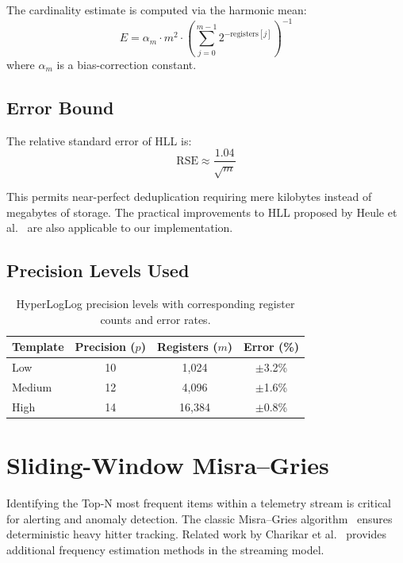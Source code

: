 The cardinality estimate is computed via the harmonic mean:
\begin{equation}
    E = \alpha_m \cdot m^2 \cdot \left( \sum_{j=0}^{m-1} 2^{-\text{registers}[j]} \right)^{-1}
\end{equation}
where $\alpha_m$ is a bias-correction constant.

\subsection{Error Bound}
The relative standard error of HLL is:
\begin{equation}
    \text{RSE} \approx \frac{1.04}{\sqrt{m}}
\end{equation}

This permits near-perfect deduplication requiring mere kilobytes instead of megabytes of storage. The practical improvements to HLL proposed by Heule et al.~\cite{heule2013hyperloglog} are also applicable to our implementation.

\subsection{Precision Levels Used}
\begin{table}[htbp]
\centering
\begin{tabular}{l c c c}
\toprule
\textbf{Template} & \textbf{Precision ($p$)} & \textbf{Registers ($m$)} & \textbf{Error (\%)} \\
\midrule
Low    & 10 & 1,024   & $\pm$3.2\% \\
Medium & 12 & 4,096   & $\pm$1.6\% \\
High   & 14 & 16,384  & $\pm$0.8\% \\
\bottomrule
\end{tabular}
\caption{HyperLogLog precision levels with corresponding register counts and error rates.}
\label{tab:hll_precision}
\end{table}

\section{Sliding-Window Misra--Gries}

Identifying the Top-N most frequent items within a telemetry stream is critical for alerting and anomaly detection. The classic Misra--Gries algorithm~\cite{misra} ensures deterministic heavy hitter tracking. Related work by Charikar et al.~\cite{charikar2002frequent} provides additional frequency estimation methods in the streaming model.

